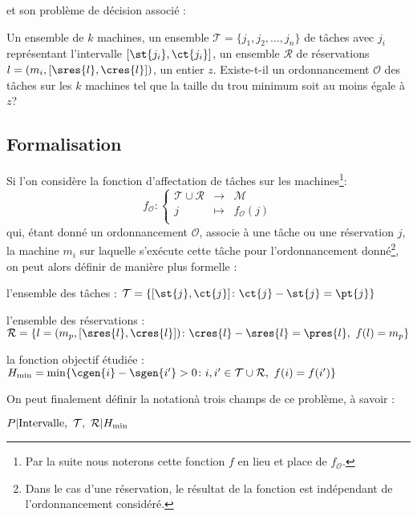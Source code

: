 \documentclass[a4paper,9pt]{report}
\begin{document}
et son problème de décision associé :

\dfdec{\fischedpi}
{Un ensemble de $k$ machines, un ensemble $\mathcal{T} = \{j_1, j_2, \dots, j_n\}$ de tâches avec
    $j_i$ représentant l'intervalle $[\st{j_i}, \ct{j_i}]$, un ensemble $\mathcal{R}$ de
réservations $l = (m_i, [\sres{l}, \cres{l}])$, un entier $z$.}
{Existe-t-il un ordonnancement $\mathcal{O}$ des tâches sur les $k$ machines tel que la taille du
trou minimum soit au moins égale à $z$?}

\subsection{Formalisation}
    Si l'on considère la fonction d'affectation de tâches sur les machines\footnote{Par la suite
    nous noterons cette fonction $f$ en lieu et place de $f_{\mathcal{O}}$.}: \[
        f_{\mathcal{O}} : \left \lbrace \begin{array}{rcl}
            \mathcal{T} \cup \mathcal{R} & \longrightarrow & \mathcal{M} \\
            j & \mapsto & f_{\mathcal{O}}(j) \\
        \end{array}
        \right .
    \]
    qui, étant donné un ordonnancement $\mathcal{O}$, associe à une tâche ou une réservation $j$, la
    machine $m_i$ sur laquelle s'exécute cette tâche pour l'ordonnancement donné\footnote{Dans le
    cas d'une réservation, le résultat de la fonction est indépendant de l'ordonnancement
    considéré.}, on peut alors définir de manière plus formelle : \begin{bitemize}
        \item l'ensemble des tâches : \hfill $ \mathcal{T} = \{[\st{j}, \ct{j}]   \colon  
            \ct{j} - \st{j} = \pt{j} \} $
        \item l'ensemble des réservations : \hfill $\mathcal{R} = \{l = (m_p, [\sres{l}, \cres{l}])  
            \colon   \cres{l} - \sres{l} = \pres{l},\ f(l) = m_p\}$
        \item la fonction objectif étudiée : \hfill $H_{\min} = \min \{ \cgen{i} - \sgen{i'} > 0  
            \colon   i,i' \in \mathcal{T} \cup \mathcal{R},\ f(i) = f(i')\}$
    \end{bitemize}

    On peut finalement définir la notationà trois champs de ce problème, à savoir : 
    \begin{center}
        $P \arrowvert \mbox{Intervalle},\ \mathcal{T},\ \mathcal{R} \arrowvert H_{\min}$
    \end{center}
    
\end{document}
